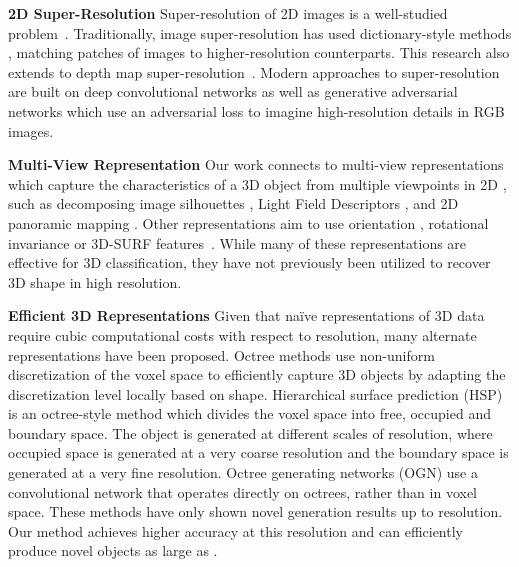 \documentclass{article}
\begin{document}
\textbf{2D Super-Resolution} \quad Super-resolution of 2D images is a well-studied problem~\cite{park2003super}. 
Traditionally, image super-resolution has used dictionary-style methods \cite{freeman2002example, yang2010image}, matching patches of images to higher-resolution counterparts. This research also extends to depth map super-resolution~\cite{mac2012patch, park2011high,MSNET}. Modern approaches to super-resolution are built on deep convolutional networks \cite{dong2016image, wang2015deep, osendorfer2014image} as well as generative adversarial networks \cite{SRGAN,karras2018progressive} which use an adversarial loss to imagine high-resolution details in RGB images.

\textbf{Multi-View Representation} \quad Our work connects to multi-view representations which capture the characteristics of a 3D object from multiple viewpoints in 2D \cite{koenderink1976singularities, murase1995visual, su2015multi, qi2016volumetric, kar2017learning, shin2018pixels, Riegler2017OctNetFusion}, such as decomposing image silhouettes \cite{macrini2002view,3DVAE}, Light Field Descriptors \cite{chen2003visual}, and 2D panoramic mapping \cite{shi2015deeppano}. 
Other representations aim to use orientation \cite{saxena2009make3d}, rotational invariance \cite{kazhdan2003rotation} or 3D-SURF features~\cite{knopp2010hough}. While many of these representations are effective for 3D classification,
they have not previously been utilized to recover 3D shape in high resolution.


\textbf{Efficient 3D Representations} \quad Given that na\"ive representations of 3D data require cubic computational costs with respect to resolution, many alternate representations have been proposed. Octree methods \cite{OGN, HSP} use non-uniform discretization of the voxel space to efficiently capture 3D objects by adapting the discretization level locally based on shape. Hierarchical surface prediction (HSP)~\cite{HSP} is an octree-style method which divides the voxel space into free, occupied and boundary space. The object is generated at different scales of resolution, where occupied space is generated at a very coarse resolution and the boundary space is generated at a very fine resolution. Octree generating networks (OGN) \cite{OGN} use a convolutional network that operates directly on octrees, rather than in voxel space. These methods have only shown novel generation results up to  resolution. Our method achieves higher accuracy at this resolution and can efficiently produce novel objects as large as .
\end{document}

